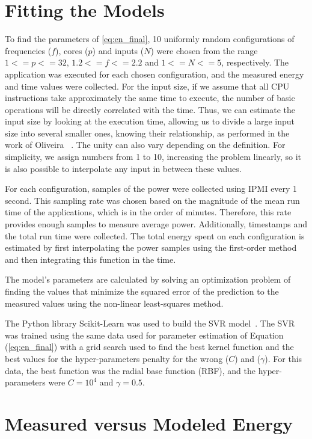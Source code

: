 \section{Fitting the Models} \label{subsec:fitting_the_models}
To find the parameters of  \cref{eq:en_final}, 10 uniformly random configurations of frequencies ($f$), cores ($p$) and inputs ($N$) were chosen from the range $1<=p<=32$, $1.2<=f<=2.2$ and $1<=N<=5$, respectively. The application was executed for each chosen configuration, and the measured energy and time values were collected. For the input size, if we assume that all CPU instructions take approximately the same time to execute, the number of basic operations will be directly correlated with the time. Thus, we can estimate the input size by looking at the execution time, allowing us to divide a large input size into several smaller ones, knowing their relationship, as performed in the work of Oliveira ~\cite{Oliveira2018ApplicationCharacterization}. The unity can also vary depending on the definition. For simplicity, we assign numbers from 1 to 10, increasing the problem linearly, so it is also possible to interpolate any input in between these values.

For each configuration, samples of the power were collected using IPMI every 1 second. This sampling rate was chosen based on the magnitude of the mean run time of the applications, which is in the order of minutes. Therefore, this rate provides enough samples to measure average power. Additionally, timestamps and the total run time were collected. The total energy spent on each configuration is estimated by first interpolating the power samples using the first-order method and then integrating this function in the time.

The model's parameters are calculated by solving an optimization problem of finding the values that minimize the squared error of the prediction to the measured values using the non-linear least-squares method.

The Python library Scikit-Learn was used to build the SVR model~\cite{Pedregosa2011Scikit-learn:Python}. The SVR was trained using the same data used for parameter estimation of Equation (\ref{eq:en_final}) %
with a grid search used to find the best kernel function and the best values for the hyper-parameters penalty for the wrong ($C$) and ($\gamma$). For this data, the best function was the radial base function (RBF), and the hyper-parameters were $C=10^4$ and $\gamma=0.5$.


\section{Measured versus Modeled Energy} \label{sec:measured_versus_modeled_energy}


